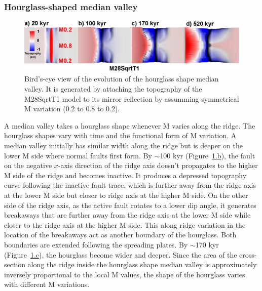 \subsubsection{Hourglass-shaped median valley}

\begin{figure}[h]
  \centering
    \includegraphics[width=1.0\textwidth]{./Figures/fig_Results_3_2_hourglass_evolution.eps}
  \caption{Bird's-eye view of the evolution of the hourglass shape median valley. It is generated by attaching the topography of the M28SqrtT1 model to its mirror reflection by assumming symmetrical M variation (0.2 to 0.8 to 0.2). }
 \label{fig_Results_3_2_hourglass_evolution}
\end{figure}

A median valley takes a hourglass shape whenever M varies along the ridge. The hourglass shapes vary with time and the functional form of M variation. %
A median valley initially has similar width along the ridge but is deeper on the lower M side where normal faults first form. By $\sim$100 kyr (Figure~\hyperref[fig_Results_3_2_hourglass_evolution]{\ref{fig_Results_3_2_hourglass_evolution}.b}), the fault on the negative $x$-axis direction of the ridge axis doesn't propagates to the higher M side of the ridge and becomes inactive. It produces a depressed topography curve following the inactive fault trace, which is further away from the ridge axis at the lower M side but closer to ridge axis at the higher M side. On the other side of the ridge axis, as the active fault rotates to a lower dip angle, it generates breakaways that are further away from the ridge axis at the lower M side while closer to the ridge axis at the higher M side. This along ridge variation in the location of the breakaways act as another boundary of the hourglass. Both boundaries are extended following the spreading plates. By $\sim$170 kyr (Figure~\hyperref[fig_Results_3_2_hourglass_evolution]{\ref{fig_Results_3_2_hourglass_evolution}.c}), the hourglass become wider and deeper. Since the area of the cross-section along the ridge inside the hourglass shape median valley is approximately inversely proportional to the local M values, the shape of the hourglass varies with different M variations.

